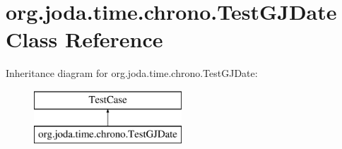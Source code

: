 \hypertarget{classorg_1_1joda_1_1time_1_1chrono_1_1_test_g_j_date}{\section{org.\-joda.\-time.\-chrono.\-Test\-G\-J\-Date Class Reference}
\label{classorg_1_1joda_1_1time_1_1chrono_1_1_test_g_j_date}
}
Inheritance diagram for org.\-joda.\-time.\-chrono.\-Test\-G\-J\-Date\-:\begin{figure}[H]
\begin{center}
\leavevmode
\includegraphics[height=2.000000cm]{classorg_1_1joda_1_1time_1_1chrono_1_1_test_g_j_date}
\end{center}
\end{figure}
